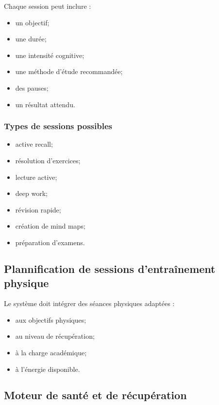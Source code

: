 \documentclass[12pt]{article}
\begin{document}
Chaque session peut inclure :
\begin{itemize}
    \item un objectif;
    \item une durée;
    \item une intensité cognitive;
    \item une méthode d’étude recommandée;
    \item des pauses;
    \item un résultat attendu.
\end{itemize}

\subsubsection{Types de sessions possibles}

\begin{itemize}
    \item active recall;
    \item résolution d’exercices;
    \item lecture active;
    \item deep work;
    \item révision rapide;
    \item création de mind maps;
    \item préparation d’examens.
\end{itemize}

\subsection{Plannification de sessions d’entraînement physique}

Le système doit intégrer des séances physiques adaptées :
\begin{itemize}
    \item aux objectifs physiques;
    \item au niveau de récupération;
    \item à la charge académique;
    \item à l’énergie disponible.
\end{itemize}

\subsection{Moteur de santé et de récupération}
\end{document}
